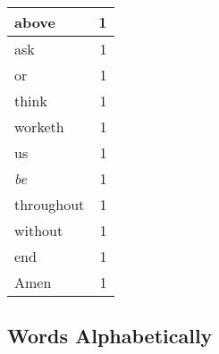 \begin{center}
\begin{longtable}{l|r}
above & 1\\ \hline 
ask & 1\\ \hline 
or & 1\\ \hline 
think & 1\\ \hline 
worketh & 1\\ \hline 
us & 1\\ \hline 
\emph{be} & 1\\ \hline 
throughout & 1\\ \hline 
without & 1\\ \hline 
end & 1\\ \hline 
Amen & 1\\ \hline 
\end{longtable}  
\end{center}  


  
\normalsize  

  
  


\subsection{Words Alphabetically}

